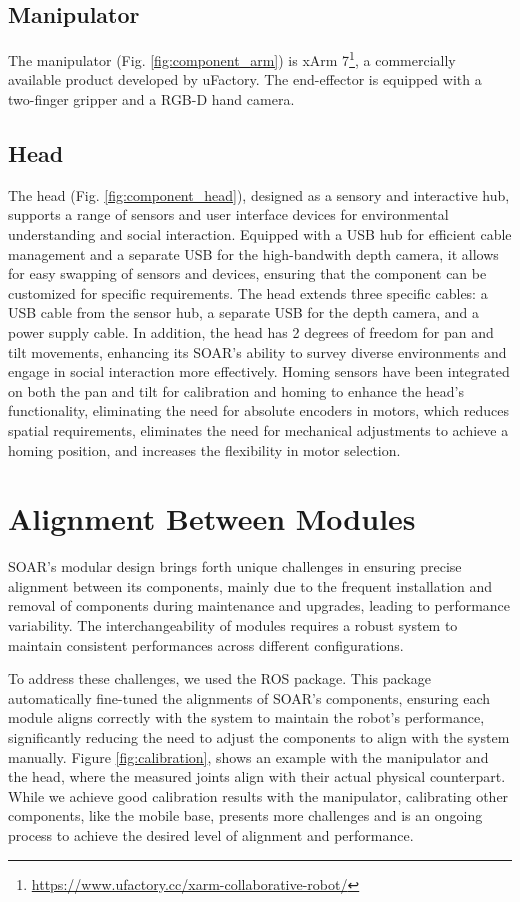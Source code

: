 \documentclass[runningheads,a4paper]{llncs}
\begin{document}
\subsection{Manipulator}
The manipulator (Fig. \ref{fig:component_arm}) is xArm 7\footnote{\url{https://www.ufactory.cc/xarm-collaborative-robot/}}, a commercially available product developed by uFactory.
The end-effector is equipped with a two-finger gripper and a RGB-D hand camera.

\subsection{Head}
The head (Fig. \ref{fig:component_head}), designed as a sensory and interactive hub, supports a range of sensors and user interface devices for environmental understanding and social interaction.
Equipped with a USB hub for efficient cable management and a separate USB for the high-bandwith depth camera, it allows for easy swapping of sensors and devices, ensuring that the component can be customized for specific requirements.
The head extends three specific cables: a USB cable from the sensor hub, a separate USB for the depth camera, and a power supply cable.
In addition, the head has 2 degrees of freedom for pan and tilt movements, enhancing its SOAR’s ability to survey diverse environments and engage in social interaction more effectively.
Homing sensors have been integrated on both the pan and tilt for calibration and homing to enhance the head's functionality, eliminating the need for absolute encoders in motors, which reduces spatial requirements, eliminates the need for mechanical adjustments to achieve a homing position, and increases the flexibility in motor selection.

\section{Alignment Between Modules}
SOAR's modular design brings forth unique challenges in ensuring precise alignment between its components, mainly due to the frequent installation and removal of components during maintenance and upgrades, leading to performance variability.
The interchangeability of modules requires a robust system to maintain consistent performances across different configurations.

To address these challenges, we used the \cite{ferguson2015robust} ROS package.
This package automatically fine-tuned the alignments of SOAR's components, ensuring each module aligns correctly with the system to maintain the robot's performance, significantly reducing the need to adjust the components to align with the system manually.
Figure \ref{fig:calibration}, shows an example with the manipulator and the head, where the measured joints align with their actual physical counterpart.
While we achieve good calibration results with the manipulator, calibrating other components, like the mobile base, presents more challenges and is an ongoing process to achieve the desired level of alignment and performance.
\end{document}
